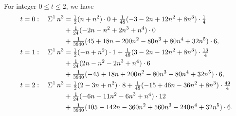 \begin{example}
  For integer $0 \le t \le 2$, we have
  \begin{align*}
    t=0:\quad \Sigma^{1}\,{n}^{3}
    &=
    \tfrac{1}{2}(n+n^2)\cdot0
    +\tfrac{1}{48}(-3-2n+12n^2+8n^3)\cdot\tfrac{1}{4} \\
    &+\tfrac{1}{24}(-2n-n^2+2n^3+n^4)\cdot0 \\
    &+\tfrac{1}{3840}(45+18n-200n^2-80n^3+80n^4+32n^5)\cdot6,
    \\
    t=1:\quad \Sigma^{1}\,{n}^{3}
    &=
    \tfrac{1}{2}(-n+n^2)\cdot1
    +\tfrac{1}{48}(3-2n-12n^2+8n^3)\cdot\tfrac{13}{4} \\
    &+\tfrac{1}{24}(2n-n^2-2n^3+n^4)\cdot6 \\
    &+\tfrac{1}{3840}(-45+18n+200n^2-80n^3-80n^4+32n^5)\cdot6,
    \\
    t=2:\quad \Sigma^{1}\,{n}^{3}
    &=
    \tfrac{1}{2}(2-3n+n^2)\cdot8
    +\tfrac{1}{48}(-15+46n-36n^2+8n^3)\cdot\tfrac{49}{4} \\
    &+\tfrac{1}{24}(-6n+11n^2-6n^3+n^4)\cdot12 \\
    &+\tfrac{1}{3840}(105-142n-360n^2+560n^3-240n^4+32n^5)\cdot6.
  \end{align*}
\end{example}
